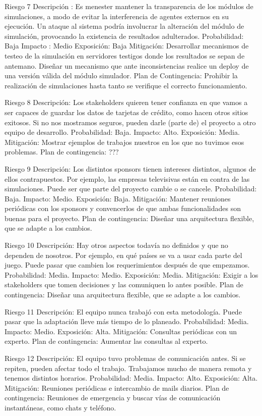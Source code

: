 Riesgo 7
Descripción : Es menester mantener la transparencia de los módulos de simulaciones, a modo de evitar la interferencia de agentes externos en su ejecución. Un ataque al sistema podría involucrar la alteración del módulo de simulación, provocando la existencia de resultados adulterados.
Probabilidad: Baja
Impacto : Medio
Exposición: Baja
Mitigación: Desarrollar mecanismos de testeo de la simulación en servidores testigos donde los resultados se sepan de antemano. Diseñar un mecanismo que ante inconsistencias realice un deploy de una versión válida del módulo simulador.
Plan de Contingencia: Prohibir la realización de simulaciones hasta tanto se verifique el correcto funcionamiento.


Riesgo 8
Descripción: Los stakeholders quieren tener confianza en que vamos a ser capaces de guardar los datos de tarjetas de crédito, como hacen otros sitios exitosos. Si no nos mostramos seguros, pueden darle (parte de) el proyecto a otro equipo de desarrollo.
Probabilidad: Baja.
Impacto: Alto.
Exposición: Media.
Mitigación: Mostrar ejemplos de trabajos nuestros en los que no tuvimos esos problemas.
Plan de contingencia: ???

Riesgo 9
Descripción: Los distintos sponsors tienen intereses distintos, algunos de ellos contrapuestos. Por ejemplo, las empresas televisivas están en contra de las simulaciones. Puede ser que parte del proyecto cambie o se cancele.
Probabilidad: Baja.
Impacto: Medio.
Exposición: Baja.
Mitigación: Mantener reuniones periódicas con los sponsors y convencerlos de que ambas funcionalidades son buenas para el proyecto.
Plan de contingencia: Diseñar una arquitectura flexible, que se adapte a los cambios.

Riesgo 10
Descripción: Hay otros aspectos todavía no definidos y que no dependen de nosotros. Por ejemplo, en qué países se va a usar cada parte del juego. Puede pasar que cambien los requerimientos después de que empezamos.
Probabilidad: Media.
Impacto: Medio.
Exposición: Media.
Mitigación: Exigir a los stakeholders que tomen decisiones y las comuniquen lo antes posible.
Plan de contingencia: Diseñar una arquitectura flexible, que se adapte a los cambios.

Riesgo 11
Descripción: El equipo nunca trabajó con esta metodología. Puede pasar que la adaptación lleve más tiempo de lo planeado.
Probabilidad: Media.
Impacto: Medio.
Exposición: Alta.
Mitigación: Consultas periódicas con un experto.
Plan de contingencia: Aumentar las consultas al experto.

Riesgo 12
Descripción: El equipo tuvo problemas de comunicación antes. Si se repiten, pueden afectar todo el trabajo. Trabajamos mucho de manera remota y tenemos distintos horarios.
Probabilidad: Media.
Impacto: Alto.
Exposición: Alta.
Mitigación: Reuniones periódicas e intercambio de mails diarios.
Plan de contingencia: Reuniones de emergencia y buscar vías de comunicación instantáneas, como chats y teléfono.

